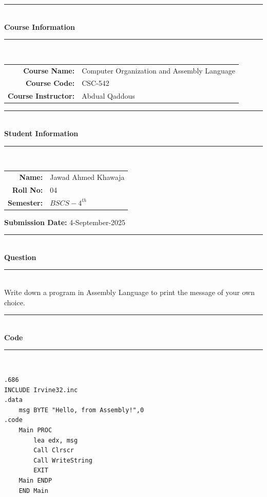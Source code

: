 \documentclass[a4paper,12pt]{article}
\begin{document}
\thispagestyle{empty}



\begin{titlepage}
    \centering
    \rule{\textwidth}{1pt} \\[0.5cm]
    {\Large \textbf{Course Information}}\\[0.2cm]
    \rule{\textwidth}{1pt} \\[1.2cm]
    
    \begin{tabular}{rl}
        \textbf{Course Name:} & Computer Organization and Assembly Language \\
        \textbf{Course Code:} & CSC-542 \\
        \textbf{Course Instructor:} & Abdual Qaddous \\
    \end{tabular}
    
    \vfill
    
    \rule{\textwidth}{1pt} \\[0.5cm]
    {\Large \textbf{Student Information}}\\[0.2cm]
    \rule{\textwidth}{1pt} \\[1.2cm]
    
    \begin{tabular}{rl}
        \textbf{Name:} & Jawad Ahmed Khawaja \\
        \textbf{Roll No:} & 04 \\
        \textbf{Semester:} & $BSCS-4^{th}$ \\
    \end{tabular}
    
    \vfill
    {\large \textbf{Submission Date:} 4-September-2025}
    
\end{titlepage}

\newpage
\centering
\rule{\textwidth}{1pt} \\[0.5cm]
    {\Large \textbf{Question}}\\[0.2cm]
\rule{\textwidth}{1pt} \\ [0.5cm]


Write down a program in Assembly Language to print the message of your own choice.
\rule{\textwidth}{1pt} \\[0.5cm]
    {\Large \textbf{Code}}\\[0.2cm]
\rule{\textwidth}{1pt} \\[1.2cm]


\begin{tcolorbox}[colback=white,colframe=black,title=Assembly Code]
\begin{verbatim}
.686
INCLUDE Irvine32.inc 
.data
    msg BYTE "Hello, from Assembly!",0
.code
    Main PROC
        lea edx, msg
        Call Clrscr
        Call WriteString
        EXIT
    Main ENDP
    END Main
\end{verbatim}
\end{tcolorbox}
\end{document}
